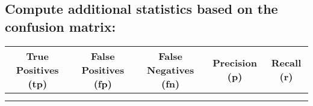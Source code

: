 \documentclass{article}
\begin{document}
\subsection{Compute additional statistics based on the confusion matrix:}


\begin{table}[ht!]
    \large
    \centering
    \begin{tabular}{|c|c|c|c|c|}
    \hline
        True Positives (tp) & False Positives (fp) & False Negatives (fn) & Precision (p) & Recall (r) \\ \hline
         &  &  &  & \\ 
         &  &  &  & \\ \hline
    \end{tabular}
\end{table}
\end{document}
